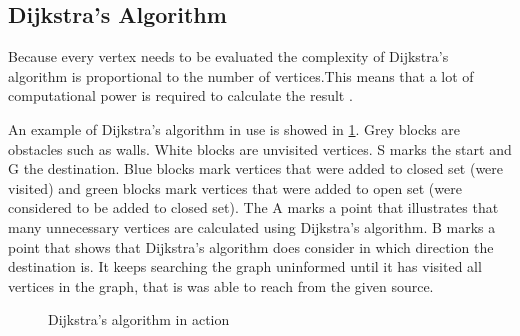 





  \subsection{Dijkstra's Algorithm}\label{subs_dijkstra}

  Because every vertex needs to be evaluated the complexity of Dijkstra's algorithm is proportional to the number of vertices.This means that a lot of computational power is required to calculate the result \cite{Dijkstr1959}.

  An example of Dijkstra's algorithm in use is showed in \cref{fig:dijkstra}. Grey blocks are obstacles such as walls. White blocks are unvisited vertices. S marks the start and G the destination. Blue blocks mark vertices that were added to closed set (were visited) and green blocks mark vertices that were added to open set (were considered to be added to closed set). The A marks a point that illustrates that many unnecessary vertices are calculated using Dijkstra's algorithm. B marks a point that shows that Dijkstra's algorithm does consider in which direction the destination is. It keeps searching the graph uninformed until it has visited all vertices in the graph, that is was able to reach from the given source.


  \begin{figure}[ht!]
    \centering
    \caption{Dijkstra's algorithm in action}
    \label{fig:dijkstra}
  \end{figure}


